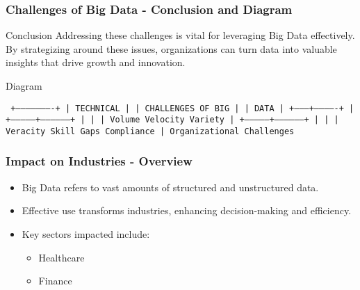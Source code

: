 \documentclass[aspectratio=169]{beamer}
\begin{document}
\begin{frame}[fragile]
    \frametitle{Challenges of Big Data - Conclusion and Diagram}
    \begin{block}{Conclusion}
    Addressing these challenges is vital for leveraging Big Data effectively. By strategizing around these issues, organizations can turn data into valuable insights that drive growth and innovation.
    \end{block}
    
    \begin{block}{Diagram}
        \begin{center}
        \texttt{
                  +----------------------+\newline
                  |    TECHNICAL         |\newline
                  |  CHALLENGES OF BIG   |\newline
                  |        DATA          |\newline
                  +--------+-------------+\newline
                           |\newline
           +---------------+-----------------+\newline
           |               |                 |\newline
       Volume          Velocity          Variety\newline
                           |\newline
           +---------------+-----------------+\newline
           |               |                 |\newline
          Veracity      Skill Gaps       Compliance\newline
                           |\newline
                        Organizational\newline
                        Challenges
        }
        \end{center}
    \end{block}
\end{frame}

\begin{frame}[fragile]
    \frametitle{Impact on Industries - Overview}
    \begin{itemize}
        \item Big Data refers to vast amounts of structured and unstructured data.
        \item Effective use transforms industries, enhancing decision-making and efficiency.
        \item Key sectors impacted include:
        \begin{itemize}
            \item Healthcare
            \item Finance
        \end{itemize}
    \end{itemize}
\end{frame}
\end{document}
